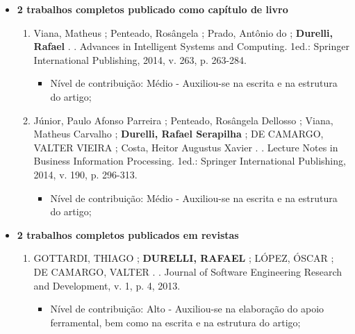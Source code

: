 \begin{itemize}
	
	\item \textbf{2 trabalhos completos publicado como capítulo de livro}
		\begin{enumerate}
			
			\item Viana, Matheus ; Penteado, Rosângela ; Prado, Antônio do ; \textbf{Durelli, Rafael} . . Advances in Intelligent Systems and Computing. 1ed.: Springer International Publishing, 2014, v. 263, p. 263-284.
			
			\begin{itemize}
			\item Nível de contribuição: Médio - Auxiliou-se na escrita e na estrutura do artigo;
			\end{itemize}
			
			\item Júnior, Paulo Afonso Parreira ; Penteado, Rosângela Dellosso ; Viana, Matheus Carvalho ; \textbf{Durelli, Rafael Serapilha} ; DE CAMARGO, VALTER VIEIRA ; Costa, Heitor Augustus Xavier . . Lecture Notes in Business Information Processing. 1ed.: Springer International Publishing, 2014, v. 190, p. 296-313.
			    \begin{itemize}
			    \item Nível de contribuição: Médio - Auxiliou-se na escrita e na estrutura do artigo;
			    \end{itemize}
			
		\end{enumerate}
	
	\item \textbf{2 trabalhos completos publicados em revistas}
		\begin{enumerate}
			\item GOTTARDI, THIAGO ; \textbf{DURELLI, RAFAEL} ; LÓPEZ, ÓSCAR ; DE CAMARGO, VALTER . . Journal of Software Engineering Research and Development, v. 1, p. 4, 2013.
			    \begin{itemize}
			        \item Nível de contribuição: Alto - Auxiliou-se na elaboração do apoio ferramental, bem como na escrita e na estrutura do artigo;
			    \end{itemize}
			    

\end{enumerate}
\end{itemize}
